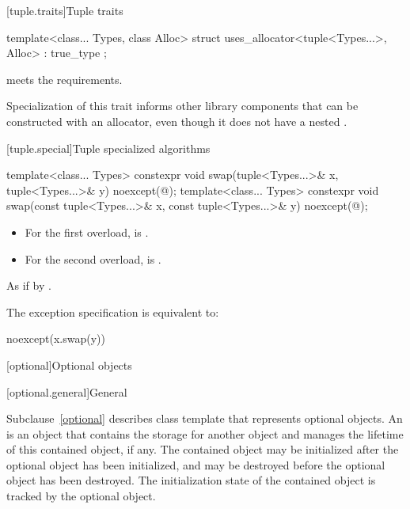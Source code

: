 [tuple.traits]{Tuple traits}

%
\begin{itemdecl}
template<class... Types, class Alloc>
  struct uses_allocator<tuple<Types...>, Alloc> : true_type { };
\end{itemdecl}

\begin{itemdescr}
\pnum
\expects
{} meets
the  requirements.

\pnum
\begin{note}
Specialization of this trait informs other library components that
 can be constructed with an allocator, even though it does not have
a nested .
\end{note}
\end{itemdescr}

[tuple.special]{Tuple specialized algorithms}

%
\begin{itemdecl}
template<class... Types>
  constexpr void swap(tuple<Types...>& x, tuple<Types...>& y) noexcept(@\seebelow@);
template<class... Types>
  constexpr void swap(const tuple<Types...>& x, const tuple<Types...>& y) noexcept(@\seebelow@);
\end{itemdecl}

\begin{itemdescr}
\pnum
\constraints
\begin{itemize}
\item
For the first overload,
 is .
\item
For the second overload,
 is .
\end{itemize}

\pnum
\effects
As if by .

\pnum
\remarks
The exception specification is equivalent to:

\begin{codeblock}
noexcept(x.swap(y))
\end{codeblock}
\end{itemdescr}

[optional]{Optional objects}

[optional.general]{General}

\pnum
Subclause~\ref{optional} describes class template  that represents
optional objects.
An  is an
object that contains the storage for another object and manages the lifetime of
this contained object, if any. The contained object may be initialized after
the optional object has been initialized, and may be destroyed before the
optional object has been destroyed. The initialization state of the contained
object is tracked by the optional object.

